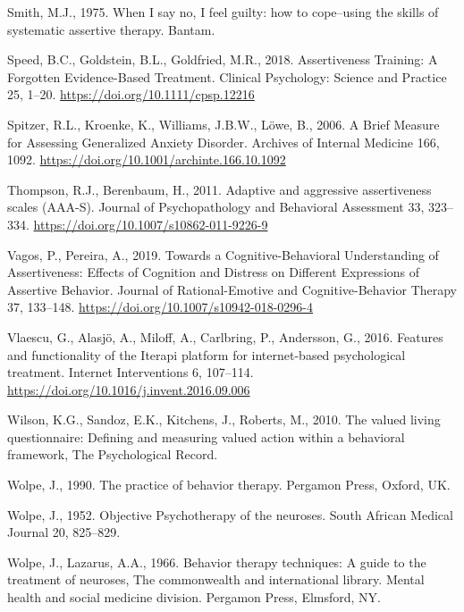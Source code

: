 \documentclass[preprint,
3p]{elsarticle} %
\newlength{\cslhangindent}
\newlength{\cslentryspacingunit} %
\newenvironment{CSLReferences}[2] %
 {%
  \setlength{\parindent}{0pt}
  \ifodd #1
  \let\oldpar\par
  \def\par{\hangindent=\cslhangindent\oldpar}
  \fi
  \setlength{\parskip}{#2\cslentryspacingunit}
 }%
 {}
\begin{document}
\begin{CSLReferences}{1}{0}
\leavevmode{}%
Smith, M.J., 1975. {When I say no, I feel guilty: how to cope--using the
skills of systematic assertive therapy}. Bantam.

\leavevmode{}%
Speed, B.C., Goldstein, B.L., Goldfried, M.R., 2018. {Assertiveness
Training: A Forgotten Evidence-Based Treatment}. Clinical Psychology:
Science and Practice 25, 1--20. \url{https://doi.org/10.1111/cpsp.12216}

\leavevmode{}%
Spitzer, R.L., Kroenke, K., Williams, J.B.W., Löwe, B., 2006. {A Brief
Measure for Assessing Generalized Anxiety Disorder}. Archives of
Internal Medicine 166, 1092.
\url{https://doi.org/10.1001/archinte.166.10.1092}

\leavevmode{}%
Thompson, R.J., Berenbaum, H., 2011. {Adaptive and aggressive
assertiveness scales (AAA-S)}. Journal of Psychopathology and Behavioral
Assessment 33, 323--334. \url{https://doi.org/10.1007/s10862-011-9226-9}

\leavevmode{}%
Vagos, P., Pereira, A., 2019. {Towards a Cognitive-Behavioral
Understanding of Assertiveness: Effects of Cognition and Distress on
Different Expressions of Assertive Behavior}. Journal of
Rational-Emotive and Cognitive-Behavior Therapy 37, 133--148.
\url{https://doi.org/10.1007/s10942-018-0296-4}

\leavevmode{}%
Vlaescu, G., Alasjö, A., Miloff, A., Carlbring, P., Andersson, G., 2016.
{Features and functionality of the Iterapi platform for internet-based
psychological treatment}. Internet Interventions 6, 107--114.
\url{https://doi.org/10.1016/j.invent.2016.09.006}

\leavevmode{}%
Wilson, K.G., Sandoz, E.K., Kitchens, J., Roberts, M., 2010. The valued
living questionnaire: Defining and measuring valued action within a
behavioral framework, The Psychological Record.

\leavevmode{}%
Wolpe, J., 1990. {The practice of behavior therapy}. Pergamon Press,
Oxford, UK.

\leavevmode{}%
Wolpe, J., 1952. {Objective Psychotherapy of the neuroses}. South
African Medical Journal 20, 825--829.

\leavevmode{}%
Wolpe, J., Lazarus, A.A., 1966. {Behavior therapy techniques: A guide to
the treatment of neuroses}, The commonwealth and international library.
Mental health and social medicine division. Pergamon Press, Elmsford,
NY.

\end{CSLReferences}
\end{document}
